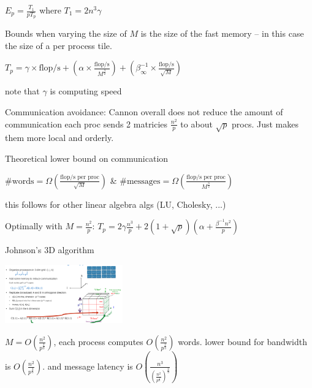 \documentclass[letter,8pt,landscape]{article}
\begin{document}
\begin{multicols}{3}
  $E_p = \frac{T_1}{pT_p}$ where $T_1 = 2n^3\gamma$

  Bounds when varying the size of $M$ is the size of the fast memory -- in this
  case the size of a per process tile.

  $T_p = \gamma \times \text{flop/s} + (\alpha \times
  \frac{\text{flop/s}}{M^{\frac{3}{2}}}) + (\beta^{-1}_\infty \times
  \frac{\text{flop/s}}{\sqrt{M}})$
  
  note that $\gamma$ is computing speed

  Communication avoidance: Cannon  overall does not reduce the amount of
  communication each proc sends 2 matricies $\frac{n^2}{p}$ to about $\sqrt{p}$
  procs. Just makes them more local and orderly. 

  Theoretical lower bound on communication 
  
  $ \# \text{words} = \Omega(\frac{\text{flop/s per proc}}{\sqrt{M}}) $ \&
  $ \# \text{messages} = \Omega(\frac{\text{flop/s per proc}}{M^{\frac{3}{2}}})$

  this follows for other linear algebra algs (LU, Cholesky, ...)


  Optimally with $M = \frac{n^2}{p}$: 
  $T_p = 2\gamma\frac{n^3}{p} + 2(1+\sqrt{p})(\alpha + \frac{\beta^{-1}n^2}{p})$
  

  Johnson’s 3D algorithm
  \begin{center}
    \includegraphics[width=2in]{images/johnson.jpg}
  \end{center}
  $M = O(\frac{n^2}{p^{\frac{2}{3}}})$, each process computes
  $O(\frac{n^2}{p^{\frac{2}{3}}})$ words. lower bound for bandwidth is
  $O(\frac{n^2}{p^{\frac{2}{3}}})$. and message latency is
  $O(\frac{n^3}{(\frac{n^2}{p^{\frac{2}{3}}})^{\frac{2}{3}}})$


\end{multicols}
\end{document}
